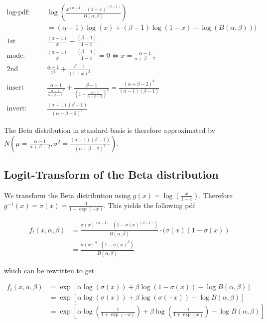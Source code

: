 \begin{align*}
\text{log-pdf: } &\log\left( \frac{x^{(\alpha - 1)} \cdot (1-x)^{(\beta-1)}}{B(\alpha, \beta)} \right) \\
&= (\alpha-1) \log(x) + (\beta-1)\log(1-x) - \log(B(\alpha,\beta)))\\
\text{1st derivative: }& \frac{(\alpha-1)}{x} - \frac{(\beta-1)}{1-x}  \\
\text{mode: }& \frac{(\alpha-1)}{x} - \frac{(\beta-1)}{1-x}  = 0 \Leftrightarrow x = \frac{\alpha-1}{\alpha + \beta - 2} \\
\text{2nd derivative: }& \frac{\alpha -1}{x^2} + \frac{\beta - 1}{(1 - x)^2} \\
\text{insert mode: }& \frac{\alpha -1}{\frac{\alpha-1}{\alpha + \beta - 2}^2} + \frac{\beta - 1}{(1 - \frac{\alpha-1}{\alpha + \beta - 2})^2} = \frac{(\alpha + \beta - 2)^3}{(\alpha-1)(\beta-1)}\\
\text{invert: }& \frac{(\alpha -1)(\beta-1)}{(\alpha + \beta - 2)^3}
\end{align*}

The Beta distribution in standard basis is therefore approximated by $N(\mu = \frac{\alpha-1}{\alpha + \beta - 2}, \sigma^2 = \frac{(\alpha -1)(\beta-1)}{(\alpha + \beta - 2)^3})$.

\subsection{Logit-Transform of the Beta distribution}

We transform the Beta distribution using $g(x) = \log(\frac{x}{1-x})$. Therefore $g^{-1}(x) = \sigma(x) = \frac{1}{1+ \exp(-x)}$. This yields the following pdf

\begin{align}
	f_t(x, \alpha, \beta) &= \frac{\sigma(x)^{(\alpha - 1)} \cdot (1 - \sigma(x)^{(\beta -1)})}{B(\alpha, \beta)} \cdot (\sigma(x)(1-\sigma(x)) \\
	&=  \frac{\sigma(x)^{\alpha} \cdot (1 - \sigma(x)^{\beta})}{B(\alpha, \beta)} \nonumber
	\label{eq:beta_logit_trans_pdf}
\end{align}

which can be rewritten to get

\begin{align}
	f_t(x, \alpha, \beta) &= \exp\left[\alpha \log(\sigma(x)) + \beta \log(1-\sigma(x)) - \log B(\alpha, \beta)\right] \\
	&= \exp\left[\alpha \log(\sigma(x)) + \beta \log(\sigma(-x)) - \log B(\alpha, \beta)\right] \\
	&= \exp\left[\alpha \log\left(\frac{1}{1 + \exp(-x)}\right) + \beta \log\left(\frac{1}{1+\exp(x)}\right) - \log B(\alpha, \beta)\right] \\
\end{align}

